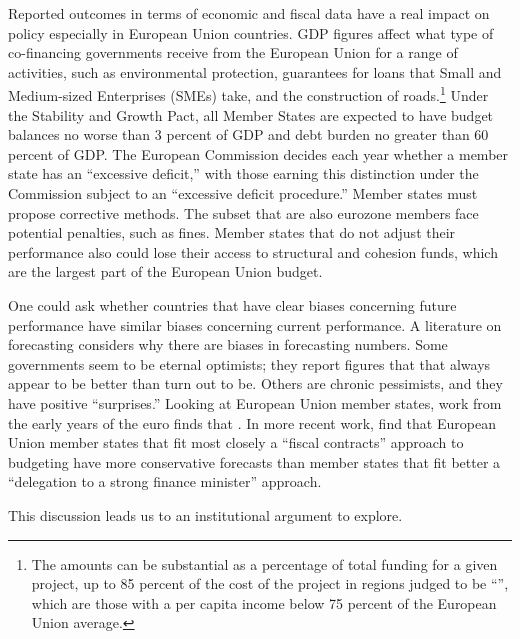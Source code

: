\documentclass[]{article}
\begin{document}
Reported outcomes in terms of economic and fiscal data have a real impact on policy especially in European Union countries. GDP figures affect what type of co-financing governments receive from the European Union for a range of activities, such as environmental protection, guarantees for loans that Small and Medium-sized Enterprises (SMEs) take, and the construction of roads.\footnote{The amounts can be substantial as a percentage of total funding for a given project, up to 85 percent of the cost of the project in regions judged to be “”, which are those with a per capita income below 75 percent of the European Union average.} Under the Stability and Growth Pact, all Member States are expected to have budget balances no worse than 3 percent of GDP and debt burden no greater than 60 percent of GDP. The European Commission decides each year whether a member state has an “excessive deficit,” with those earning this distinction under the Commission subject to an “excessive deficit procedure.” Member states must propose corrective methods. The subset that are also eurozone members face potential penalties, such as fines. Member states that do not adjust their performance also could lose their access to structural and cohesion funds, which are the largest part of the European Union budget.

One could ask whether countries that have clear biases concerning future performance have similar biases concerning current performance. A literature on forecasting considers why there are biases in forecasting numbers. Some governments seem to be eternal optimists; they report figures that that always appear to be better than turn out to be. Others are chronic pessimists, and they have positive “surprises.” Looking at European Union member states, work from the early years of the euro finds that \citep{hallerbergstrauch2002}. In more recent work, \cite{hallerbergstrauch209} find that European Union member states that fit most closely a ``fiscal contracts'' approach to budgeting have more conservative forecasts than member states that fit better a ``delegation to a strong finance minister'' approach.

This discussion leads us to an institutional argument to explore. 
\end{document}
